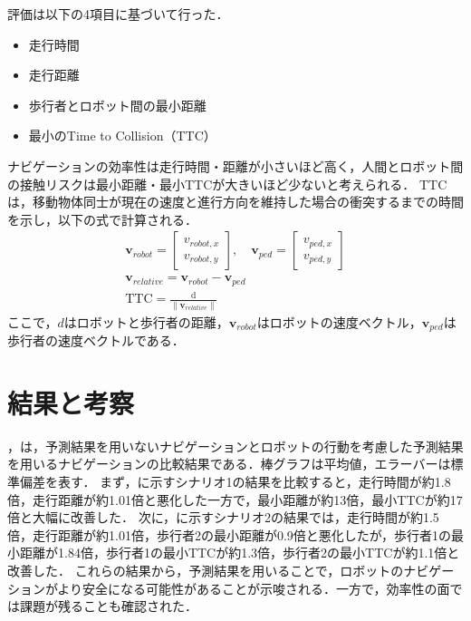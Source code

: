 評価は以下の4項目に基づいて行った．
\begin{itemize}
  \item 走行時間
  \item 走行距離
  \item 歩行者とロボット間の最小距離
  \item 最小のTime to Collision（TTC）
\end{itemize}
ナビゲーションの効率性は走行時間・距離が小さいほど高く，人間とロボット間の接触リスクは最小距離・最小TTCが大きいほど少ないと考えられる．
TTCは，移動物体同士が現在の速度と進行方向を維持した場合の衝突するまでの時間を示し，以下の式で計算される．
\setlength{\jot}{1em}
\begin{align}
  \mathbf{v}_{robot} = \begin{bmatrix} v_{robot,x} \\ v_{robot,y} \end{bmatrix}, \quad 
  \mathbf{v}_{ped} = \begin{bmatrix} v_{ped,x} \\ v_{ped,y} \end{bmatrix} \\
  \mathbf{v}_{relative} = \mathbf{v}_{robot} - \mathbf{v}_{ped} \\
  \text{TTC} = \frac{\text{d}}{\|\mathbf{v}_{relative}\|}
\end{align}
ここで，$d$はロボットと歩行者の距離，$\mathbf{v}_{robot}$はロボットの速度ベクトル，$\mathbf{v}_{ped}$は歩行者の速度ベクトルである．

\section{結果と考察}\label{sec:exp-sim-result}
，は，予測結果を用いないナビゲーションとロボットの行動を考慮した予測結果を用いるナビゲーションの比較結果である．棒グラフは平均値，エラーバーは標準偏差を表す．
まず，に示すシナリオ1の結果を比較すると，走行時間が約1.8倍，走行距離が約1.01倍と悪化した一方で，最小距離が約13倍，最小TTCが約17倍と大幅に改善した．
次に，に示すシナリオ2の結果では，走行時間が約1.5倍，走行距離が約1.01倍，歩行者2の最小距離が0.9倍と悪化したが，歩行者1の最小距離が1.84倍，歩行者1の最小TTCが約1.3倍，歩行者2の最小TTCが約1.1倍と改善した．
これらの結果から，予測結果を用いることで，ロボットのナビゲーションがより安全になる可能性があることが示唆される．一方で，効率性の面では課題が残ることも確認された．

